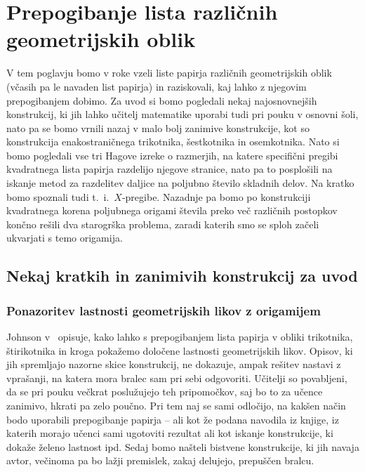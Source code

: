 \section{Prepogibanje lista različnih geometrijskih oblik}
\label{pogl:prepog_geom_likov}

V tem poglavju bomo v roke vzeli liste papirja različnih geometrijskih oblik (včasih pa le navaden list papirja) in raziskovali, kaj lahko z njegovim prepogibanjem dobimo. Za uvod si bomo pogledali nekaj najosnovnejših konstrukcij, ki jih lahko učitelj matematike uporabi tudi pri pouku v osnovni šoli, nato pa se bomo vrnili nazaj v malo bolj zanimive konstrukcije, kot so konstrukcija enakostraničnega trikotnika, šestkotnika in osemkotnika. Nato si bomo pogledali vse tri Hagove izreke o razmerjih, na katere specifični pregibi kvadratnega lista papirja razdelijo njegove stranice, nato pa to posplošili na iskanje metod za razdelitev daljice na poljubno število skladnih delov. Na kratko bomo spoznali tudi t.\ i.\ $X$-pregibe. Nazadnje pa bomo po konstrukciji kvadratnega korena poljubnega origami števila preko več različnih postopkov končno rešili dva starogrška problema, zaradi katerih smo se sploh začeli ukvarjati s temo origamija.

\subsection{Nekaj kratkih in zanimivih konstrukcij za uvod}

\subsubsection*{Ponazoritev lastnosti geometrijskih likov z origamijem}

Johnson v~\cite{johnson1957} opisuje, kako lahko s prepogibanjem lista papirja v obliki trikotnika, štirikotnika in kroga pokažemo določene lastnosti geometrijskih likov. Opisov, ki jih spremljajo nazorne skice konstrukcij, ne dokazuje, ampak rešitev nastavi z vprašanji, na katera mora bralec sam pri sebi odgovoriti. Učitelji so povabljeni, da se pri pouku večkrat poslužujejo teh pripomočkov, saj bo to za učence zanimivo, hkrati pa zelo poučno. Pri tem naj se sami odločijo, na kakšen način bodo uporabili prepogibanje papirja -- ali kot že podana navodila iz knjige, iz katerih morajo učenci sami ugotoviti rezultat ali kot iskanje konstrukcije, ki dokaže želeno lastnost ipd. Sedaj bomo našteli bistvene konstrukcije, ki jih navaja avtor, večinoma pa bo lažji premislek, zakaj delujejo, prepuščen bralcu.


